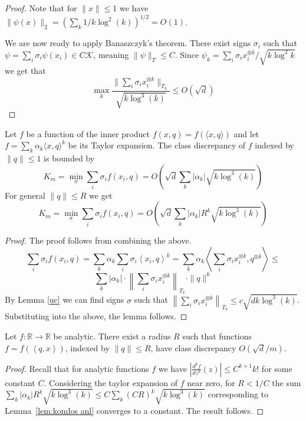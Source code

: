 \documentclass[anon,12pt]{colt2019} %
\newcommand{\ip}[1]{\left \langle #1 \right \rangle}
\newcommand{\R}{\mathbb{R}}
\begin{document}
{\begin{proof}
\noindent Note that for $\|x\| \le 1$ we have $\|\psi(x)\|_2 = (\sum_k  1/k\log^2(k))^{1/2} = O(1)$.


We are now ready to apply Banaszczyk's theorem. 
There exist signs $\sigma_i$ such that $\psi  = \sum_i \sigma_i \psi(x_i) \in C \mathcal K$, meaning $\|\psi\|_T \leq C$.
Since $\psi_k = \sum_i \sigma_i x_i^{\otimes k}/\sqrt{k \log^2{k}}$ we get that 
$$\max_k \frac{\|\sum_i \sigma_i  x_i^{\otimes k}\|_{T_k}}{\sqrt{k \log^{3}(k)}} \le O\left( \sqrt{d} \right)$$
\end{proof}

\begin{lemma} \label{lem:komlos anl}
Let $f$ be a function of the inner product $f(x,q) = f(\langle x,q\rangle)$ and let $f = \sum_k \alpha_k \langle x,q\rangle^k$ be its Taylor expansion. 
The class discrepancy of $f$ indexed by $\|q\| \leq 1$ is bounded by
\[
K_m = \min_\sigma \sum_i \sigma_i f(x_i,q) =O\left( \sqrt{d} \sum_k  |\alpha_k|\sqrt{k\log^3(k)}\right)
\]
For general $\|q\| \leq R$ we get
\[
K_m = \min_\sigma \sum_i \sigma_i f(x_i,q) =O\left( \sqrt{d} \sum_k  |\alpha_k| R^k \sqrt{ k\log^3(k)}\right)
\]
\end{lemma}
\begin{proof}
The proof follows from combining the above.
$$
\sum_i \sigma_i f(x_i,q) = \sum_k \alpha_k \sum_i \sigma_i \ip{ x_i,q}^k =  \sum_k \alpha_k  \ip{  \sum_i \sigma_i x_i^{\otimes k},q^{\otimes k}} \le $$
$$\sum_k |\alpha_k| \cdot \left\| \sum_i \sigma_i x_i^{\otimes k}\right\|_{T_k} \cdot \|q\|^k
$$
By Lemma \ref{uc} we can find signs $\sigma$ such that 
$\left\| \sum_i \sigma_i x_i^{\otimes k}\right\|_{T_k} \le c\sqrt{d k \log^3(k)}$. Substituting into the above, the lemma follows.
\end{proof}

\begin{theorem}\label{analitic1}
Let $f:\R\rightarrow\R$ be analytic. There exist a radius $R$ such that functions $f = f(\ip{q,x})$, indexed by $\|q\| \leq R$, have class discrepancy $O(\sqrt{d}/m)$. 
\end{theorem}
\begin{proof}
Recall that for analytic functions $f$ we have $\left| \frac{d^k f}{dz^k}(z) \right|  \leq C^{k+1} k! $
for some constant $C$. Considering the taylor expansion of $f$ near zero, for $R < 1/C$ the sum
$ \sum_k  |\alpha_k| R^k \sqrt{ k\log^3(k)} \leq C \sum_k  (CR)^k \sqrt{ k\log^3(k)}$
corresponding to Lemma~\ref{lem:komlos anl} converges to a constant. The result follows.
\end{proof}

}
\end{document}
